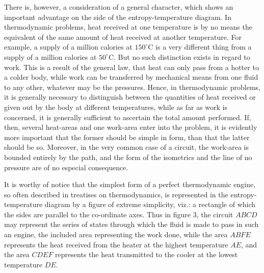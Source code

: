\documentclass[11pt]{article}
\newcommand{\figlabel}[1]{\par\smallskip\centerline{\small #1}\smallskip}
\begin{document}
\begin{figure}[h]
\centering
{}
\end{figure}

There is, however, a consideration of a general character, which shows an important advantage on the side of the entropy-temperature diagram. In thermodynamic problems, heat received at one temperature is by no means the equivalent of the same amount of heat received at another temperature. For example, a supply of a million calories at $150^{\circ}\mathrm{C}$ is a very different thing from a supply of a million calories at $50^{\circ}\mathrm{C}$. But no such distinction exists in regard to work. This is a result of the general law, that heat can only pass from a hotter to a colder body, while work can be transferred by mechanical means from one fluid to any other, whatever may be the pressures. Hence, in thermodynamic problems, it is generally necessary to distinguish between the quantities of heat received or given out by the body at different temperatures, while as far as work is concerned, it is generally sufficient to ascertain the total amount performed. If, then, several heat-areas and one work-area enter into the problem, it is evidently more important that the former should be simple in form, than that the latter should be so. Moreover, in the very common case of a circuit, the work-area is bounded entirely by the path, and the form of the isometrics and the line of no pressure are of no especial consequence.

It is worthy of notice that the simplest form of a perfect thermodynamic engine, so often described in treatises on thermodynamics, is represented in the entropy-temperature diagram by a figure of extreme simplicity, viz.: a rectangle of which the sides are parallel to the co-ordinate axes. Thus in figure 3, the circuit $ABCD$ may represent the series of states through which the fluid is made to pass in such an engine, the included area representing the work done, while the area $ABFE$ represents the heat received from the heater at the highest temperature $AE$, and the area $CDEF$ represents the heat transmitted to the cooler at the lowest temperature $DE$.
\end{document}
